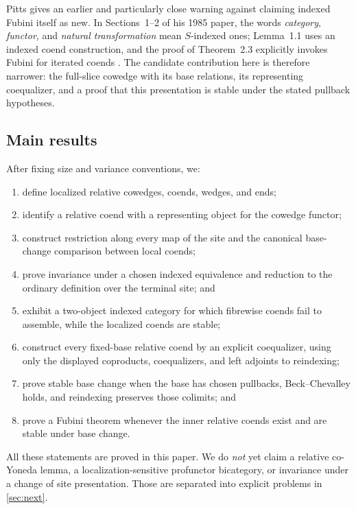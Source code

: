 Pitts gives an earlier and particularly close warning against claiming
indexed Fubini itself as new.  In Sections~1--2 of his 1985 paper, the words
\emph{category}, \emph{functor}, and \emph{natural transformation} mean
\(S\)-indexed ones; Lemma~1.1 uses an indexed coend construction, and the
proof of Theorem~2.3 explicitly invokes Fubini for iterated coends
\cite[Convention and Lemma~1.1, pp.~46--47; proof of Theorem~2.3,
p.~51]{Pitts1985}.  The candidate contribution here is therefore narrower:
the full-slice cowedge with its base relations, its representing
coequalizer, and a proof that this presentation is stable under the stated
pullback hypotheses.

\subsection*{Main results}

After fixing size and variance conventions, we:
\begin{enumerate}
  \item define localized relative cowedges, coends, wedges, and ends;
  \item identify a relative coend with a representing object for the
        cowedge functor;
  \item construct restriction along every map of the site and the canonical
        base-change comparison between local coends;
  \item prove invariance under a chosen indexed equivalence and reduction to
        the ordinary definition over the terminal site; and
  \item exhibit a two-object indexed category for which fibrewise coends fail
        to assemble, while the localized coends are stable;
  \item construct every fixed-base relative coend by an explicit
        coequalizer, using only the displayed coproducts, coequalizers, and
        left adjoints to reindexing;
  \item prove stable base change when the base has chosen pullbacks,
        Beck--Chevalley holds, and reindexing preserves those colimits; and
  \item prove a Fubini theorem whenever the inner relative coends exist and
        are stable under base change.
\end{enumerate}
All these statements are proved in this paper.  We do \emph{not} yet claim a
relative co-Yoneda lemma, a localization-sensitive profunctor bicategory, or
invariance under a change of site presentation.  Those are separated into
explicit problems in \cref{sec:next}.


